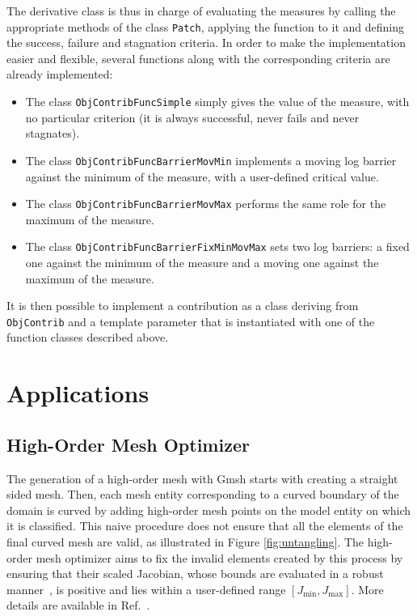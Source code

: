 \documentclass[12pt,a4paper,a4wide]{article}
\begin{document}
The derivative class is thus in charge of evaluating the measures
by calling the appropriate methods of the class \texttt{Patch},
applying the function to it and defining the success, failure and
stagnation criteria. In order to make the implementation easier
and flexible, several functions along with the corresponding
criteria are already implemented:

\begin{itemize}
\item The class \texttt{ObjContribFuncSimple} simply gives
the value of the measure, with no particular criterion (it is always
successful, never fails and never stagnates).
\item The class \texttt{ObjContribFuncBarrierMovMin} implements
a moving log barrier against the minimum of the measure, with a
user-defined critical value.
\item The class \texttt{ObjContribFuncBarrierMovMax} performs
the same role for the  maximum of the measure.
\item The class \texttt{ObjContribFuncBarrierFixMinMovMax} sets
two log barriers: a fixed one against the minimum of the measure
and a moving one against the maximum of the measure.
\end{itemize}

It is then possible to implement a contribution as a class deriving
from \texttt{ObjContrib} and a template parameter that is
instantiated with one of the function classes described above.


\section{Applications}

\subsection{High-Order Mesh Optimizer}

The generation of a high-order mesh with Gmsh starts with creating a
straight sided mesh. Then, each mesh entity corresponding to a curved
boundary of the domain is curved by adding high-order mesh points on
the model entity on which it is classified. This naive procedure does
not ensure that all the elements of the final curved mesh are valid,
as illustrated in Figure \ref{fig:untangling}. The high-order mesh
optimizer aims to fix the invalid elements created by this process
by ensuring that their scaled Jacobian, whose bounds are evaluated in
a robust manner~\cite{bounds-jcp}, is positive and lies within a
user-defined range $[J_{\min}, J_{\max}]$. More details are available
in Ref.~\cite{untangling-jcp}.
\end{document}
